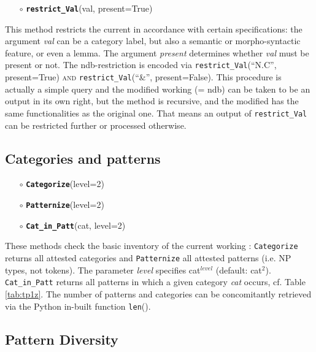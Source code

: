 \documentclass[output=paper,colorlinks,citecolor=brown,draft]{langscibook}
\begin{document}
\begin{enumerate} 
    \item[$\circ$] \textbf{\texttt{restrict\_Val}}(val, present=True) 
\end{enumerate}

\noindent This method restricts the current  in accordance with certain specifications: the argument \textit{val} can be a category label, but also a semantic or morpho-syntactic feature, or even a lemma. The argument \textit{present} determines whether \textit{val} must be present or not. The ndb-restriction is encoded via \texttt{restrict\_Val}(``N.C'', present=True) \textsc{and} \texttt{restrict\_Val}(``\&'', present=False). This procedure is actually a simple query and the modified working  (= ndb) can be taken to be an output in its own right, but the method is recursive, and the modified  has the same functionalities as the original one. That means an output of \texttt{restrict\_Val} can be restricted further or processed otherwise.

\subsection*{Categories and patterns}
\label{sec:CtPt}

\begin{enumerate} 
    \item[$\circ$] \textbf{\texttt{Categorize}}(level=2) 

    \item[$\circ$] \textbf{\texttt{Patternize}}(level=2) 

    \item[$\circ$] \textbf{\texttt{Cat\_in\_Patt}}(cat, level=2) 

\end{enumerate}

\noindent These methods check the basic inventory of the current working : \texttt{Categorize} returns all attested categories and \texttt{Patternize} all attested patterns (i.e. NP types, not tokens). The parameter \textit{level} specifies cat$^{level}$ (default: cat$^2$). \texttt{Cat\_in\_Patt} returns all patterns in which a given category \textit{cat} occurs, cf. Table \ref{tab:tp1z}. The number of patterns and categories can be concomitantly retrieved via the Python in-built function \texttt{len}(). 



\subsection*{Pattern Diversity}
\label{sec:PatD}
\end{document}
